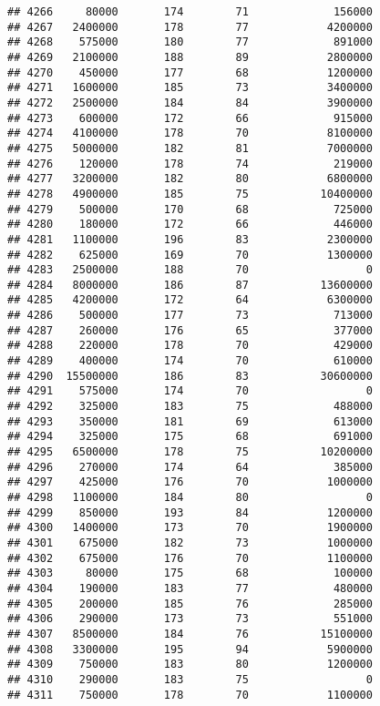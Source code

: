 \documentclass[
]{article}
\begin{document}
\begin{verbatim}
## 4266     80000       174        71             156000
## 4267   2400000       178        77            4200000
## 4268    575000       180        77             891000
## 4269   2100000       188        89            2800000
## 4270    450000       177        68            1200000
## 4271   1600000       185        73            3400000
## 4272   2500000       184        84            3900000
## 4273    600000       172        66             915000
## 4274   4100000       178        70            8100000
## 4275   5000000       182        81            7000000
## 4276    120000       178        74             219000
## 4277   3200000       182        80            6800000
## 4278   4900000       185        75           10400000
## 4279    500000       170        68             725000
## 4280    180000       172        66             446000
## 4281   1100000       196        83            2300000
## 4282    625000       169        70            1300000
## 4283   2500000       188        70                  0
## 4284   8000000       186        87           13600000
## 4285   4200000       172        64            6300000
## 4286    500000       177        73             713000
## 4287    260000       176        65             377000
## 4288    220000       178        70             429000
## 4289    400000       174        70             610000
## 4290  15500000       186        83           30600000
## 4291    575000       174        70                  0
## 4292    325000       183        75             488000
## 4293    350000       181        69             613000
## 4294    325000       175        68             691000
## 4295   6500000       178        75           10200000
## 4296    270000       174        64             385000
## 4297    425000       176        70            1000000
## 4298   1100000       184        80                  0
## 4299    850000       193        84            1200000
## 4300   1400000       173        70            1900000
## 4301    675000       182        73            1000000
## 4302    675000       176        70            1100000
## 4303     80000       175        68             100000
## 4304    190000       183        77             480000
## 4305    200000       185        76             285000
## 4306    290000       173        73             551000
## 4307   8500000       184        76           15100000
## 4308   3300000       195        94            5900000
## 4309    750000       183        80            1200000
## 4310    290000       183        75                  0
## 4311    750000       178        70            1100000

\end{verbatim}
\end{document}
